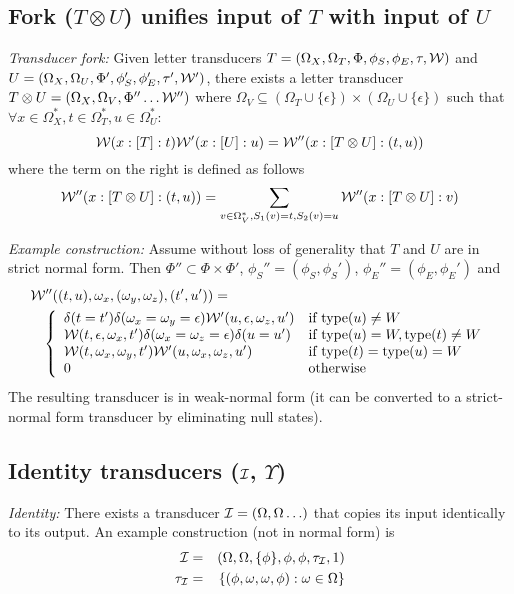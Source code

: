 \documentclass{article}
\newcommand\gappedalphabet[1]{(\Omega_{#1} \cup \{\epsilon\})}
\newcommand\gappedpair[2]{\gappedalphabet{#1} \times \gappedalphabet{#2}}
\newcommand\wtrans[4]{#1(#2 : [#3] : #4)}
\newcommand\identity{{\cal I}}
\newcommand\fork{\otimes}
\newcommand\idfork{\Upsilon}
\newcommand\States{\Phi}
\newcommand\Transitions{\tau}
\newcommand\transitionsof[1]{\Transitions_{#1}}
\newcommand\startstate{\phi_S}
\newcommand\laststate{\phi_E}
\newcommand\weight{{\cal W}}
\newcommand\statetype{\mbox{type}}
\begin{document}
\subsection{Fork ($T\fork U$) unifies input of $T$ with input of $U$}

{\em Transducer fork:}
Given letter transducers
 $T = (\Omega_X, \Omega_T, \States, \startstate, \laststate, \Transitions, \weight)$ and
 $U = (\Omega_X, \Omega_U, \States', \startstate', \laststate', \Transitions', \weight')$,
there exists a letter transducer $T\fork U = (\Omega_X, \Omega_V, \States'' \ldots \weight'')$
where $\Omega_V \subseteq \gappedpair{T}{U}$
such that $\forall x \in \Omega_X^\ast, t \in \Omega_T^\ast, u \in \Omega_U^\ast$:
\[
\wtrans{\weight}{x}{T}{t} \wtrans{\weight'}{x}{U}{u} = \wtrans{\weight''}{x}{T\fork U}{(t,u)}
\]
where the term on the right is defined as follows
\[
\wtrans{\weight''}{x}{T\fork U}{(t,u)} = \sum_{v \in \Omega_V^\ast, S_1(v)=t, S_2(v)=u } \wtrans{\weight''}{x}{T\fork U}{v}
\]

{\em Example construction:}
Assume without loss of generality that $T$ and $U$ are in strict normal form.
Then $\States'' \subset \States \times \States'$,
$\startstate''=(\startstate,\startstate')$, $\laststate''=(\laststate,\laststate')$
and
\begin{eqnarray*}
\lefteqn{\weight''((t,u),\omega_x,(\omega_y,\omega_z),(t',u')) =} & & \\
 & & \left\{ \begin{array}{ll}
\delta(t=t') \delta(\omega_x=\omega_y=\epsilon) \weight'(u,\epsilon,\omega_z,u') & \mbox{if $\statetype(u) \neq W$} \\
\weight(t,\epsilon,\omega_x,t') \delta(\omega_x=\omega_z=\epsilon) \delta(u=u') & \mbox{if $\statetype(u) = W,\statetype(t) \neq W$} \\
\weight(t,\omega_x,\omega_y,t') \weight'(u,\omega_x,\omega_z,u') & \mbox{if $\statetype(t) = \statetype(u) = W$} \\
0 & \mbox{otherwise}
\end{array} \right.
\end{eqnarray*}
The resulting transducer is in weak-normal form (it can be converted to a strict-normal form transducer by eliminating null states).

\subsection{Identity transducers ($\identity$, $\idfork$)}

{\em Identity:}
There exists a transducer $\identity=(\Omega,\Omega\ldots)$ that copies its input identically to its output.
An example construction (not in normal form) is
\begin{eqnarray*}
\identity & = & (\Omega,\Omega,\{\phi\},\phi,\phi,\transitionsof{\identity},1) \\
\transitionsof{\identity} & = & \left\{(\phi,\omega,\omega,\phi):\omega\in\Omega\right\}
\end{eqnarray*}
\end{document}
